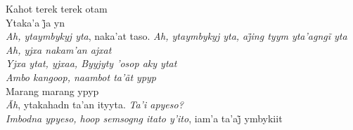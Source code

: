 \begin{linenumbers}\begingroup\raggedright

\noindent   Kahot terek terek otam\\
  Ytaka’a j̃a yn\\
  \emph{Ah, ytaymbykyj yta}, naka’at taso. \emph{Ah, ytaymbykyj yta, aj̃ing tyym yta’agngĩ yta}\\
  \emph{Ah, yjxa nakam'an ajxat}\\
  \emph{Yjxa ytat, yjxaa, Byyjyty 'osop aky ytat}\\
  \emph{Ambo kangoop, naambot ta'ãt ypyp}\\
  Marang marang ypyp\\
  \emph{Ãh}, ytakahadn ta'an ityyta. \emph{Ta'i apyeso?}\\
  \emph{Imbodna ypyeso, hoop semsogng itato y’ito}, iam’a ta’aj̃ ymbykiit

\end{linenumbers}\endgroup

\bigskip

